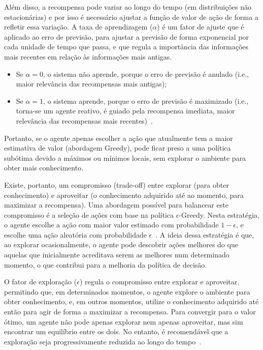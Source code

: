 Além disso, a recompensa pode variar ao longo do tempo (em distribuições não estacionárias) e por isso é necessário ajustar a função de valor de ação de forma a refletir essa variação.
A taxa de aprendizagem ($\alpha$) é um fator de ajuste que é aplicado ao erro de previsão, para ajustar a previsão de forma exponencial por cada unidade de tempo que passa, e que regula a importância das informações mais recentes em relação às informações mais antigas.

\begin{itemize}
    \item Se $\alpha = 0$, o sistema não aprende, porque o erro de previsão é anulado (i.e., maior relevância das recompensas mais antigas);
    \item Se $\alpha = 1$, o sistema aprende, porque o erro de previsão é maximizado (i.e., torna-se um agente reativo, é guiado pela recompensa imediata, maior relevância das recompensas mais recentes)~\cite{isel:iasa:slides:aprendizagem-por-reforco}.
\end{itemize}

Portanto, se o agente apenas escolher a ação que atualmente tem a maior estimativa de valor (abordagem Greedy), pode ficar preso a uma política subótima devido a máximos ou mínimos locais, sem explorar o ambiente para obter mais conhecimento.

Existe, portanto, um compromisso (trade-off) entre explorar (para obter conhecimento) e aproveitar (o conhecimento adquirido até ao momento, para maximizar a recompensa).
Uma abordagem possível para balancear este compromisso é a seleção de ações com base na política $\epsilon$-Greedy.
Nesta estratégia, o agente escolhe a ação com maior valor estimado com probabilidade $1 - \epsilon$, e escolhe uma ação aleatória com probabilidade $\epsilon$~\cite{isel:iasa:slides:aprendizagem-por-reforco}.
A ideia dessa estratégia é que, ao explorar ocasionalmente, o agente pode descobrir ações melhores do que aquelas que inicialmente acreditava serem as melhores num determinado momento, o que contribui para a melhoria da política de decisão.

O fator de exploração ($\epsilon$) regula o compromisso entre explorar e aproveitar, permitindo que, em determinados momentos, o agente explore o ambiente para obter conhecimento, e, em outros momentos, utilize o conhecimento adquirido até então para agir de forma a maximizar a recompensa.
Para convergir para o valor ótimo, um agente não pode apenas explorar nem apenas aproveitar, mas sim encontrar um equilíbrio entre os dois.
No entanto, é recomendável que a exploração seja progressivamente reduzida ao longo do tempo~\cite{isel:iasa:slides:aprendizagem-por-reforco}.

